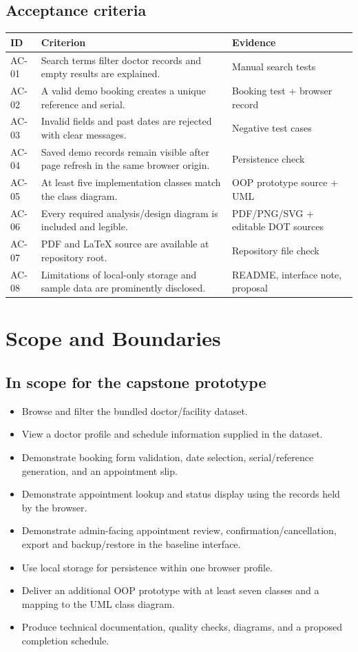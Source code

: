\documentclass[11pt,a4paper]{article}
\begin{document}
\subsection{Acceptance criteria}
\begin{tabularx}{\textwidth}{p{1.0cm}X p{4.0cm}}
\toprule
\textbf{ID} & \textbf{Criterion} & \textbf{Evidence}\\\midrule
AC-01 & Search terms filter doctor records and empty results are explained. & Manual search tests\\
AC-02 & A valid demo booking creates a unique reference and serial. & Booking test + browser record\\
AC-03 & Invalid fields and past dates are rejected with clear messages. & Negative test cases\\
AC-04 & Saved demo records remain visible after page refresh in the same browser origin. & Persistence check\\
AC-05 & At least five implementation classes match the class diagram. & OOP prototype source + UML\\
AC-06 & Every required analysis/design diagram is included and legible. & PDF/PNG/SVG + editable DOT sources\\
AC-07 & PDF and LaTeX source are available at repository root. & Repository file check\\
AC-08 & Limitations of local-only storage and sample data are prominently disclosed. & README, interface note, proposal\\
\bottomrule
\end{tabularx}

\section{Scope and Boundaries}
\subsection{In scope for the capstone prototype}
\begin{itemize}
  \item Browse and filter the bundled doctor/facility dataset.
  \item View a doctor profile and schedule information supplied in the dataset.
  \item Demonstrate booking form validation, date selection, serial/reference generation, and an appointment slip.
  \item Demonstrate appointment lookup and status display using the records held by the browser.
  \item Demonstrate admin-facing appointment review, confirmation/cancellation, export and backup/restore in the baseline interface.
  \item Use local storage for persistence within one browser profile.
  \item Deliver an additional OOP prototype with at least seven classes and a mapping to the UML class diagram.
  \item Produce technical documentation, quality checks, diagrams, and a proposed completion schedule.
\end{itemize}
\end{document}
